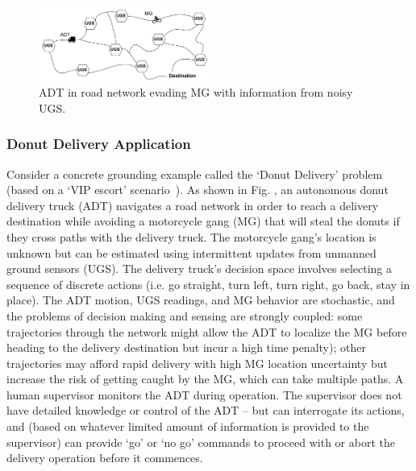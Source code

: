     
	\begin{figure}[t]%
    	\centering
     	\includegraphics[width=0.5\textwidth]{Figures/RoadNet}
    	\caption{ADT in road network evading MG with information from noisy UGS.} 
        \label{fig:RoadNet}
        \vspace{-0.2cm}
    \end{figure}    
    
\subsubsection{Donut Delivery Application} \label{sec:donut_delivery}
Consider a concrete grounding example called the `Donut Delivery' problem (based on a `VIP escort' scenario~\cite{Humphrey2012-lr}). As shown in Fig. \label{fig:RoadNet} , an autonomous donut delivery truck (ADT) navigates a road network in order to reach a delivery destination while avoiding a motorcycle gang (MG) that will steal the donuts if they cross paths with the delivery truck. The motorcycle gang's location is unknown but can be estimated using intermittent updates from unmanned ground sensors (UGS). The delivery truck's decision space involves selecting a sequence of discrete actions (i.e. go straight, turn left, turn right, go back, stay in place). The ADT motion, UGS readings, and MG behavior are stochastic, and the problems of decision making and sensing are strongly coupled: some trajectories through the network might allow the ADT to localize the MG before heading to the delivery destination but incur a high time penalty); other trajectories may afford rapid delivery with high MG location uncertainty but increase the risk of getting caught by the MG, which can take multiple paths. A human supervisor monitors the ADT during operation. The supervisor does not have detailed knowledge or control of the ADT -- but can interrogate its actions, and (based on whatever limited amount of information is provided to the supervisor) can provide `go' or `no go' commands to proceed with or abort the delivery operation before it commences. 

